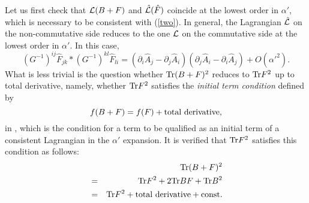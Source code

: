 \documentclass[a4paper,12pt]{article}
\begin{document}
Let us first check that ${\cal L} (B+F)$ and $\hat{{\cal L}} (\hat{F})$
coincide at the lowest order in $\alpha'$,
which is necessary to be consistent with (\ref{two}).
In general,
the Lagrangian $\hat{{\cal L}}$ on the non-commutative side
reduces to the one ${\cal L}$ on the commutative side
at the lowest order in $\alpha'$.
In this case,
\begin{equation}
(G^{-1})^{ij} \hat{F}_{jk} \ast (G^{-1})^{kl} \hat{F}_{li}
= ( \partial_i \hat{A}_j  - \partial_j \hat{A}_i )
  ( \partial_j \hat{A}_i  - \partial_i \hat{A}_j )
  + O(\alpha'^2).
\end{equation}
What is less trivial is the question whether
${\rm Tr} (B+F)^2$ reduces to ${\rm Tr} F^2$
up to total derivative, namely,
whether ${\rm Tr} F^2$ satisfies the {\it initial term condition}
defined by
\begin{equation}
f(B+F) = f(F) + {\rm total~derivative},
\label{initial}
\end{equation}
in \cite{Okawa}, which is the condition for a term
to be qualified as an initial term of a consistent Lagrangian
in the $\alpha'$ expansion.
It is verified that ${\rm Tr} F^2$ satisfies this condition
as follows:
\begin{eqnarray}
&& {\rm Tr} (B+F)^2
\nonumber \\
&=& {\rm Tr} F^2
+2 {\rm Tr} BF
+ {\rm Tr} B^2
\nonumber \\
&=& {\rm Tr} F^2 
+ {\rm total~derivative} + {\rm const}.
\end{eqnarray}
\end{document}
